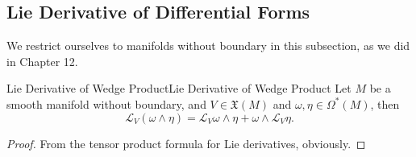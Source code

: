 \documentclass[../main.tex]{subfiles}
\begin{document}
\subsection{Lie Derivative of Differential Forms}
We restrict ourselves to manifolds without boundary in this subsection, as we did in Chapter 12.

\begin{proposition}{Lie Derivative of Wedge Product}{Lie Derivative of Wedge Product}
  Let $M$ be a smooth manifold without boundary, and $V \in \mathfrak{X}(M)$ and $\omega, \eta \in \Omega^*(M)$, then
  \begin{equation*}
    \mathcal{L}_V (\omega \wedge \eta) = \mathcal{L}_V \omega \wedge \eta + \omega \wedge \mathcal{L}_V \eta.
  \end{equation*}
\end{proposition}
\begin{proof}
  From the tensor product formula for Lie derivatives, obviously.
\end{proof}
\end{document}
